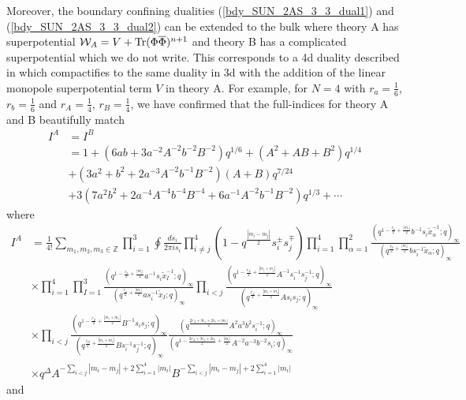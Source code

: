 \documentclass[12pt]{article}
\newcommand{\Wcal}{\mathcal{W}}
\DeclareMathOperator*{\Tr}{{\rm Tr}}
\numberwithin{equation}{section}
\begin{document}
Moreover, the boundary confining dualities (\ref{bdy_SUN_2AS_3_3_dual1}) and (\ref{bdy_SUN_2AS_3_3_dual2}) can be extended to the bulk where theory A has superpotential $\Wcal_A = V + \Tr (\Phi \overline{\Phi})^{n+1}$ and theory B has a complicated superpotential which we do not write. This corresponds to a 4d duality described in \cite{Intriligator:1995ax} which compactifies to the same duality in 3d with the addition of the linear monopole superpotential term $V$ in theory A. 
For example, for $N=4$ with $r_a=\frac16$, $r_b=\frac16$ and $r_A=\frac14$, $r_B=\frac14$, we have confirmed that the full-indices for theory A and B beautifully match
\begin{align}
I^A&=I^B
\nonumber\\
&=1+(6ab+3a^{-2}A^{-2}b^{-2}B^{-2})q^{1/6}
+(A^2+AB+B^2)q^{1/4}
\nonumber\\
&
+(3a^2+b^2+2a^{-3}A^{-2}b^{-1}B^{-2})(A+B)q^{7/24}
\nonumber\\
&+3(7a^2b^2+2a^{-4}A^{-4}b^{-4}B^{-4}+6a^{-1}A^{-2}b^{-1}B^{-2})q^{1/3}+\cdots
\end{align}
where 
\begin{align}
I^A&=
\frac{1}{4!}\sum_{m_1,m_2,m_3\in \mathbb{Z}}
\prod_{i=1}^3 
\oint 
\frac{ds_i}{2\pi is_i}
\prod_{i \ne j}^4 (1-q^{\frac{|m_i-m_j|}{2}}s_i^{\pm}s_j^{\mp})
\prod_{i=1}^4
\prod_{\alpha=1}^{2}
\frac{
(q^{1-\frac{r_b}{2}+\frac{|m_i|}{2}}b^{-1}s_i\tilde{x}_{\alpha}^{-1};q)_{\infty}
}{
(q^{\frac{r_b}{2}+\frac{|m_i|}{2}}bs_i^{-1}\tilde{x}_{\alpha};q)_{\infty}
}
\nonumber\\
&\times 
\prod_{i=1}^4 \prod_{I=1}^3 
\frac{
(q^{1-\frac{r_a}{2}+\frac{|m_i|}{2}}a^{-1}s_i\tilde{x}_{I}^{-1};q)_{\infty}
}
{
(q^{\frac{r_a}{2}+\frac{|m_i|}{2}}as_i^{-1}\tilde{x}_{I};q)_{\infty}
}
\prod_{i<j}
\frac{
(q^{1-\frac{r_A}{2}+\frac{|m_i+m_j|}{2}}A^{-1}s_i^{-1}s_j^{-1};q)_{\infty}
}
{
(q^{\frac{r_A}{2}+\frac{|m_i+m_j|}{2}}As_is_j;q)_{\infty}
}
\nonumber\\
&\times 
\prod_{i<j}
\frac{
(q^{1-\frac{r_B}{2}+\frac{|m_i+m_j|}{2}}B^{-1}s_is_j;q)_{\infty}
}
{
(q^{\frac{r_B}{2}+\frac{|m_i+m_j|}{2}}Bs_i^{-1}s_j^{-1};q)_{\infty}
}
\frac{
(q^{\frac{2r_A+3r_a+2r_b+|m_i|}{2}}A^{2}a^3 b^2 s_i^{-1};q)_{\infty}
}
{
(q^{1-\frac{2r_A+3r_a+2r_b}{2}+\frac{|m_i|}{2}}A^{-2}a^{-3}b^{-2}s_i;q)_{\infty}
}
\nonumber\\
&\times 
q^{
\Delta
}
A^{-\sum_{i<j}|m_i-m_j|+2\sum_{i=1}^4|m_i|}
B^{-\sum_{i<j}|m_i-m_j|+2\sum_{i=1}^4|m_i|}
\end{align}
and 
\end{document}
